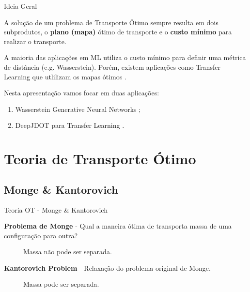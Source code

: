 \documentclass[10pt]{beamer}
\begin{document}
\begin{frame}[fragile]{Ideia Geral}

	A solução de um problema de Transporte Ótimo sempre resulta
	em dois subprodutos, o \textbf{plano (mapa)} ótimo de transporte
	e o \textbf{custo mínimo} para realizar o transporte.

	\vspace{3mm}
	A maioria das aplicações em ML utiliza o custo mínimo para
	definir uma métrica de distância (e.g. Wasserstein). Porém,
	existem aplicações como Transfer Learning que utlilizam
	os mapas ótimos \citep{sales2021optimal}.

	Nesta apresentação vamos focar em duas aplicações:

	\begin{enumerate}
		\item Wasserstein Generative Neural Networks \citep{arjovsky2017wasserstein};
		\item DeepJDOT para Transfer Learning \citep{damodaran2018deepjdot}.
	\end{enumerate}

\end{frame}

\AtBeginSection{}
\section[Teoria de Transporte Ótimo]{Teoria de Transporte Ótimo}
\subsection[Teoria OT]{Monge \& Kantorovich}
\begin{frame}[fragile]{Teoria OT - Monge \& Kantorovich}

	\textbf{Problema de Monge} -
	Qual a maneira ótima de transporta massa de uma configuração
	para outra?
	\vspace{3mm}

	\begin{figure}[H]
		\centering
		\def\svgscale{0.4}
		
		\caption{Massa não pode ser separada.}
		\label{fig:mongeproblem}
	\end{figure}

	\textbf{Kantorovich Problem} -
	Relaxação do problema original de Monge.
	\vspace{3mm}

	\begin{figure}[H]
		\centering
		\def\svgscale{0.4}
		
		\caption{Massa pode ser separada.}
		\label{fig:kantorovichproblem}
	\end{figure}

\end{frame}
\end{document}
